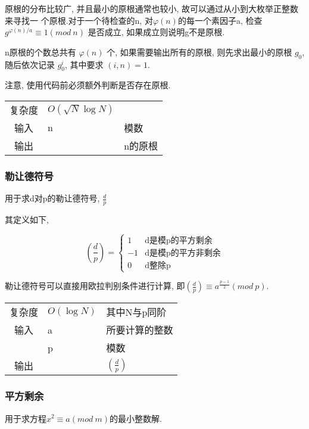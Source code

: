 原根的分布比较广, 并且最小的原根通常也较小, 故可以通过从小到大枚举正整数来寻找一
个原根.对于一个待检查的n, 对$\varphi(n)$的每一个素因子a, 检查$g^{\varphi(n)/a} \equiv 1(mod\ n)$
是否成立, 如果成立则说明g不是原根.

n原根的个数总共有 $\varphi(n)$ 个, 如果需要输出所有的原根, 则先求出最小的原根 $g_0$, 随后依次记录 $g_0^i$, 其中要求 $(i, n) = 1$.

注意, 使用代码前必须额外判断是否存在原根.
\begin{longtable}{|c|l|l|}
复杂度 & $O(\sqrt{N}\log N)$ & \\
输入 & n & 模数 \\
输出 &  & n的原根 \\
\end{longtable}



        \subsubsection{勒让德符号}\small
用于求d对p的勒让德符号, $\frac{d}{p}$

其定义如下, 

\[ (\frac{d}{p}) = 
\begin{cases}
 1 & \text{d是模p的平方剩余} \\
 -1 & \text{d是模p的平方非剩余} \\
 0 & \text{d整除p}
\end{cases} \]

勒让德符号可以直接用欧拉判别条件进行计算, 即$(\frac{d}{p}) \equiv a ^ {\frac{p-1}{2}}(mod\ p)$.

\begin{longtable}{|c|l|l|}
复杂度 & $O(\log N)$ & 其中N与p同阶  \\
输入 & a & 所要计算的整数 \\
 & p & 模数 \\
输出 &  & $(\frac{d}{p})$ \\
\end{longtable}



        \subsubsection{平方剩余}\small
用于求方程$x^{2} \equiv a(mod\ m)$的最小整数解.

